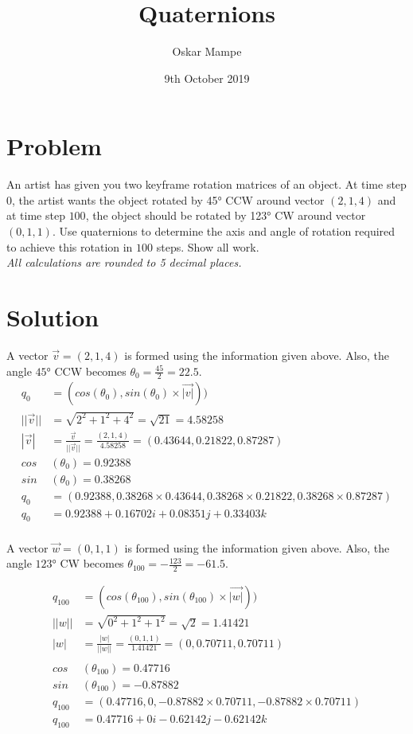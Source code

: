 \documentclass{article}
\author{Oskar Mampe}
\title{Quaternions}
\date{9th October 2019}
\begin{document}
\maketitle
\section*{Problem}
An artist has given you two keyframe rotation matrices of an object.  At time step $0$, the artist wants the object rotated by \ang{45} CCW around vector $(2,1,4)$ and at time step $100$, the object should be rotated by \ang{123} CW around vector $(0,1,1)$.
Use quaternions to determine the axis and angle of rotation required to achieve this rotation in $100$ steps.  Show all work.\\[1em]

\textit{All calculations are rounded to 5 decimal places.}

\section*{Solution}



A vector $\vec{v} = (2,1,4)$ is formed using the information given above. Also, the angle $\ang{45}$ CCW becomes $\theta_0 = \frac{45}{2} = 22.5$. 
\begin{align*}
q_0 &= (cos(\theta_0), sin(\theta_0) \times \vec{|v|}))\\[1em]
||\vec{v}|| &= \sqrt{2^2 + 1^ 2 + 4^2}
= \sqrt{21} 
= 4.58258\\[1em]
%
|\vec{v}| &= 
\frac{\vec{v}}{||\vec{v}||} = 
\frac{(2, 1, 4)}{4.58258 }
= (0.43644, 0.21822, 0.87287)\\[1em]
%
cos&(\theta_0) = 0.92388\\[1em]
sin&(\theta_0) = 0.38268\\[1em]
q_0 &= (0.92388,0.38268 \times 0.43644, 0.38268 \times 0.21822, 0.38268 \times 0.87287)\\[1em]
q_0 &= 0.92388 + 0.16702i + 0.08351j + 0.33403k\\[1em]
\end{align*}

A vector $\vec{w} = (0,1,1)$ is formed using the information given above. Also, the angle $\ang{123}$ CW becomes $\theta_{100} = -\frac{123}{2} = -61.5$.

\begin{align*}
q_{100} &= (cos(\theta_{100}), sin(\theta_{100}) \times \vec{|w|}))\\[1em]
||w|| &= \sqrt{0^2 + 1^2 + 1^2} = \sqrt{2} = 1.41421\\[1em]
|w| &= \frac{|w|}{||w||} = \frac{(0,1,1)}{1.41421} = (0, 0.70711, 0.70711)\\[1em]
\\[1em]
cos&(\theta_{100}) = 0.47716\\[1em]
sin&(\theta_{100}) = -0.87882\\[1em]
q_{100} &= (0.47716, 0, -0.87882 \times 0.70711, -0.87882 \times 0.70711)\\[1em]
q_{100} &= 0.47716 + 0i -0.62142j -0.62142k\\[1em]
\end{align*}
\end{document}
